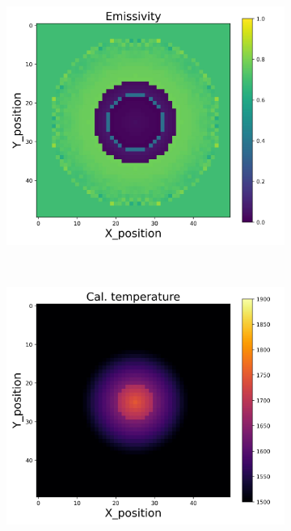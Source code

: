 \begin{figure}[htbp]
\begin{minipage}{\textwidth}
\begin{subfigure}{0.325\textwidth}
        \end{subfigure}
        \begin{subfigure}{0.325\textwidth}
            \centering
            \includegraphics[width=\textwidth]{figures/raw_data/21/quad/emi_cal.jpg}
        \end{subfigure}
    \end{minipage}\\
    \begin{minipage}{\textwidth}
        \centering
        \begin{subfigure}{0.325\textwidth}
            \centering
            \includegraphics[width=\textwidth]{figures/raw_data/5/quad/T_cal.jpg}

\end{subfigure}
\end{minipage}
\end{figure}
